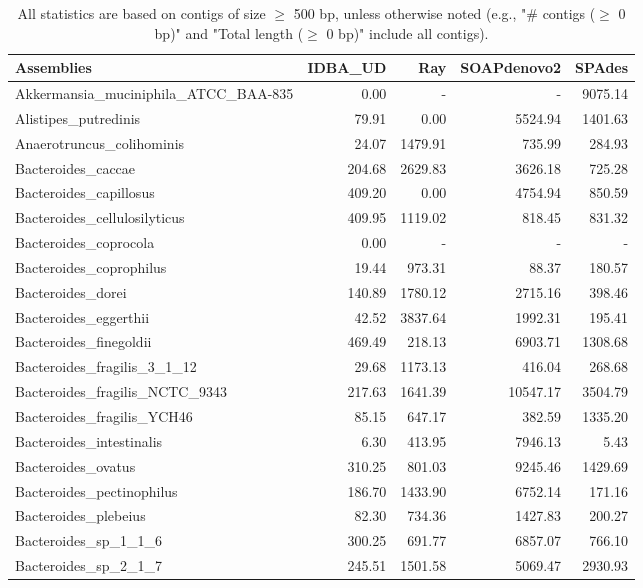 \documentclass[12pt,a4paper]{article}
\begin{document}
\begin{table}[ht]
\begin{center}
\caption{All statistics are based on contigs of size $\geq$ 500 bp, unless otherwise noted (e.g., "\# contigs ($\geq$ 0 bp)" and "Total length ($\geq$ 0 bp)" include all contigs).}
\begin{tabular}{|l*{4}{|r}|}
\hline
Assemblies & IDBA\_UD & Ray & SOAPdenovo2 & SPAdes \\ \hline
Akkermansia\_muciniphila\_ATCC\_BAA-835 & 0.00 & - & - & 9075.14 \\ \hline
Alistipes\_putredinis & 79.91 & 0.00 & 5524.94 & 1401.63 \\ \hline
Anaerotruncus\_colihominis & 24.07 & 1479.91 & 735.99 & 284.93 \\ \hline
Bacteroides\_caccae & 204.68 & 2629.83 & 3626.18 & 725.28 \\ \hline
Bacteroides\_capillosus & 409.20 & 0.00 & 4754.94 & 850.59 \\ \hline
Bacteroides\_cellulosilyticus & 409.95 & 1119.02 & 818.45 & 831.32 \\ \hline
Bacteroides\_coprocola & 0.00 & - & - & - \\ \hline
Bacteroides\_coprophilus & 19.44 & 973.31 & 88.37 & 180.57 \\ \hline
Bacteroides\_dorei & 140.89 & 1780.12 & 2715.16 & 398.46 \\ \hline
Bacteroides\_eggerthii & 42.52 & 3837.64 & 1992.31 & 195.41 \\ \hline
Bacteroides\_finegoldii & 469.49 & 218.13 & 6903.71 & 1308.68 \\ \hline
Bacteroides\_fragilis\_3\_1\_12 & 29.68 & 1173.13 & 416.04 & 268.68 \\ \hline
Bacteroides\_fragilis\_NCTC\_9343 & 217.63 & 1641.39 & 10547.17 & 3504.79 \\ \hline
Bacteroides\_fragilis\_YCH46 & 85.15 & 647.17 & 382.59 & 1335.20 \\ \hline
Bacteroides\_intestinalis & 6.30 & 413.95 & 7946.13 & 5.43 \\ \hline
Bacteroides\_ovatus & 310.25 & 801.03 & 9245.46 & 1429.69 \\ \hline
Bacteroides\_pectinophilus & 186.70 & 1433.90 & 6752.14 & 171.16 \\ \hline
Bacteroides\_plebeius & 82.30 & 734.36 & 1427.83 & 200.27 \\ \hline
Bacteroides\_sp\_1\_1\_6 & 300.25 & 691.77 & 6857.07 & 766.10 \\ \hline
Bacteroides\_sp\_2\_1\_7 & 245.51 & 1501.58 & 5069.47 & 2930.93 \\ \hline

\end{tabular}
\end{center}
\end{table}
\end{document}
